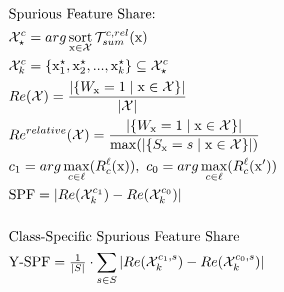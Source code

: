 \begin{align}\displaystyle
& \text{Spurious Feature Share: } \notag &  \\
& \mathcal{X}_{\star}^{c} = arg \operatorname*{sort}_{\mathrm{x} \in \mathcal{X}} \mathcal{T}_{sum}^{c,rel}(\mathrm{x}) & 
\notag \\
& \mathcal{X}_{k}^{c} = \{ \mathrm{x}_{1}^{\star},\mathrm{x}_{2}^{\star},..., \mathrm{x}_{k}^{\star} \} \subseteq \mathcal{X}_{\star}^{c} & \notag \\
& Re(\mathcal{X}) = \frac{ |\{W_{\mathrm{x}} = 1 \mid \mathrm{x} \in \mathcal{X} \}|   }
{|\mathcal{X}|}  & \notag \\
& Re^{relative}(\mathcal{X}) = \frac{ |\{W_{\mathrm{x}} = 1 \mid \mathrm{x} \in \mathcal{X} \}|   }
{\max(|\{S_{\mathrm{x}} = s \mid \mathrm{x} \in \mathcal{X}\}|)}  & \notag \\
& c_1 = arg\max_{c \in \ell} (R_c^{\ell}(\mathrm{x}) ), \  c_0 = arg\max_{c \in \ell} (R_c^{\ell}(\mathrm{x'})) & \notag \\
& \text{SPF} = |Re(\mathcal{X}_k^{c_1}) - Re(\mathcal{X}_k^{c_0})|  & \\ \notag
\\
& \text{Class-Specific Spurious Feature Share } \notag & \\
& \text{Y-SPF} =\tfrac{1}{|S|} \cdot
\sum_{s \in S} | Re(\mathcal{X}_k^{c_1, s}) - Re(\mathcal{X}_k^{c_0, s})| & 
\end{align}


